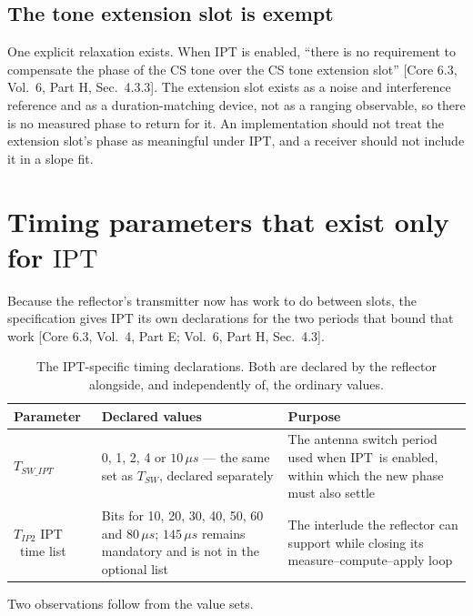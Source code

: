 \documentclass[11pt,a4paper]{article}
\newcommand{\us}{\,\ensuremath{\upmu}s}
\newcommand{\IPT}{\ensuremath{\mathrm{IPT}}}
\newcommand{\Tsw}{T_{SW}}
\newcommand{\Tswipt}{T_{SW\_IPT}}
\newcommand{\Tiptwo}{T_{IP2}}
\providecommand{\upmu}{\mu}
\newcommand{\core}[1]{\textcolor{rulegrey}{\small[Core 6.3, #1]}}
\begin{document}
\subsection{The tone extension slot is exempt}

One explicit relaxation exists. When \IPT{} is enabled, ``there is no requirement to compensate the
phase of the CS tone over the CS tone extension slot''
\core{Vol.\ 6, Part H, Sec.\ 4.3.3}. The extension slot exists as a noise and interference reference
and as a duration-matching device, not as a ranging observable, so there is no measured phase to
return for it. An implementation should not treat the extension slot's phase as meaningful under
\IPT, and a receiver should not include it in a slope fit.

\section{Timing parameters that exist only for \IPT}
\label{sec:timing}

Because the reflector's transmitter now has work to do between slots, the specification gives \IPT{}
its own declarations for the two periods that bound that work
\core{Vol.\ 4, Part E; Vol.\ 6, Part H, Sec.\ 4.3}.

\begin{table}[h]
\caption{The \IPT-specific timing declarations. Both are declared by the reflector alongside, and
independently of, the ordinary values.}
\label{tab:iptt}
\centering\small
\begin{tabular}{@{}L{34mm}L{44mm}L{54mm}@{}}
\toprule
Parameter & Declared values & Purpose \\
\midrule
$\Tswipt$ & 0, 1, 2, 4 or $10\us$ --- the same set as $\Tsw$, declared separately & The antenna switch period used when \IPT\ is enabled, within which the new phase must also settle \\
$\Tiptwo$ \IPT\ time list & Bits for 10, 20, 30, 40, 50, 60 and $80\us$; $145\us$ remains mandatory and is not in the optional list & The interlude the reflector can support while closing its measure--compute--apply loop \\
\bottomrule
\end{tabular}
\end{table}

Two observations follow from the value sets.
\end{document}
